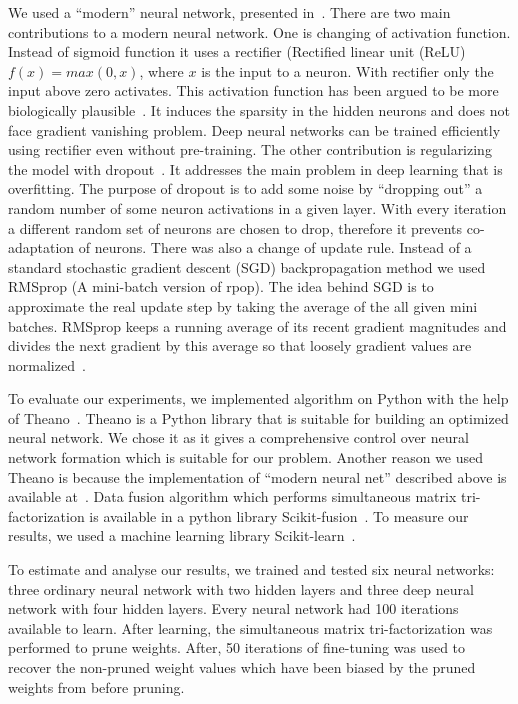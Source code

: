 \documentclass{article} %
\begin{document}
We used a “modern” neural network, presented in~\cite{github}. There are two
main contributions to a modern neural network. One is changing of activation
function. Instead of sigmoid function it uses a rectifier (Rectified linear 
unit (ReLU) $f(x) = max(0, x)$, where $x$ is the input to a neuron. With
rectifier only the input above zero activates. This
activation function has been argued to be more biologically
plausible~\cite{AISTATS2011_GlorotBB11}. It induces the sparsity in the hidden
neurons and does not face gradient vanishing problem. Deep neural networks
can be trained efficiently using rectifier even without pre-training. 
The other contribution is regularizing the model with
dropout~\cite{srivastava2014dropout}. It addresses
the main problem in deep learning that is overfitting. The purpose of dropout
is to add some noise by “dropping out” a random number of some neuron
activations in a given layer. With every iteration a different random set of
neurons are chosen to drop, therefore it prevents co-adaptation of neurons.
There was also a change of update rule. Instead of a standard stochastic
gradient descent (SGD) backpropagation method we used RMSprop (A mini-batch
version of rpop). The idea behind SGD is to approximate the real update step by
taking the average of the all given mini batches.
RMSprop keeps a running average of its recent gradient magnitudes and divides
the next gradient by this average so that loosely gradient values are
normalized~\cite{lecture}. 

To evaluate our experiments, we implemented algorithm on Python with the help
of Theano~\cite{Bastien-Theano-2012, bergstra+al:2010-scipy}. Theano is a
Python library that is suitable for building an optimized neural network. We
chose it as it gives a comprehensive control over neural network formation
which is suitable for our problem. Another reason we used Theano is because the
implementation of “modern neural net” described above is available at~\cite{github}.
Data fusion algorithm which performs simultaneous matrix
tri-factorization is available in a python library
Scikit-fusion~\cite{zitnik2015data}. To measure our results, we used a machine
learning library Scikit-learn~\cite{scikit-learn}.

To estimate and analyse our results, we trained and tested six neural networks: 
three 
ordinary neural network with two hidden layers and three deep neural network 
with four 
hidden layers. Every neural network had 100 iterations available to learn. After 
learning, the simultaneous matrix tri-factorization was performed to prune 
weights. After, 50 iterations of fine-tuning was used to recover the non-pruned 
weight values which have been biased by the pruned weights from before 
pruning. 
\end{document}
